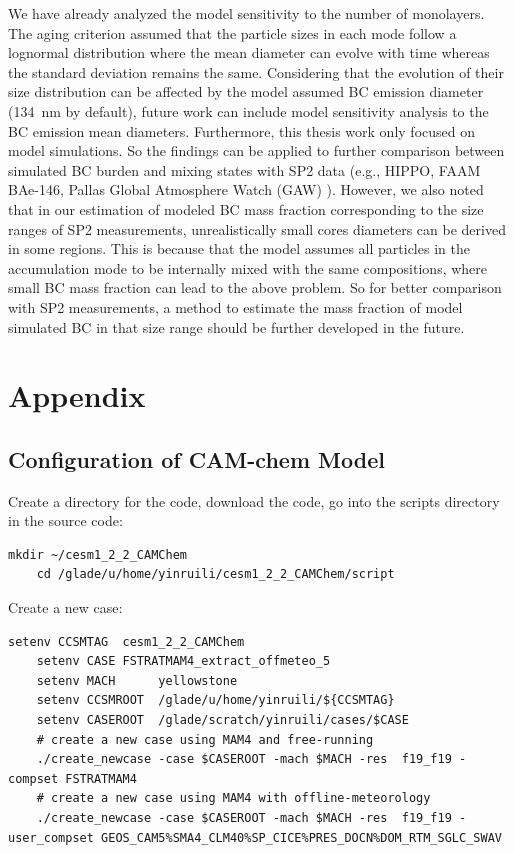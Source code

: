\documentclass[12pt, fullpage]{uiucthesis2009}
\begin{document}
		We have already analyzed the model sensitivity to the number of monolayers. The aging criterion assumed that the particle sizes in each mode follow a lognormal distribution where the mean diameter can evolve with time whereas the standard deviation remains the same. Considering that the evolution of their size distribution can be affected by the model assumed BC emission diameter (134~nm by default), future work can include model sensitivity analysis to the BC emission mean diameters. Furthermore, this thesis work only focused on model simulations. So the findings can be applied to further comparison between simulated BC burden and mixing states with SP2 data (e.g., HIPPO, FAAM BAe-146, Pallas Global Atmosphere Watch (GAW) ). However, we also noted that in our estimation of modeled BC mass fraction corresponding to the size ranges of SP2 measurements, unrealistically small cores diameters can be derived in some regions. This is because that the model assumes all particles in the accumulation mode to be internally mixed with the same compositions, where small BC mass fraction can lead to the above problem. So for better comparison with SP2 measurements, a method to estimate the mass fraction of model simulated BC in that size range should be further developed in the future.
		
		 
		


	
	
	\chapter{Appendix}
	
	\section{Configuration of CAM-chem Model}
	Create a directory for the code, download the code, go into the scripts directory in the source code:
	\begin{lstlisting}[xleftmargin=0.01\textwidth, xrightmargin=0.01\textwidth]
	mkdir ~/cesm1_2_2_CAMChem
	cd /glade/u/home/yinruili/cesm1_2_2_CAMChem/script
	\end{lstlisting}
	
	Create a new case:
	\begin{lstlisting}[xleftmargin=0.01\textwidth, xrightmargin=0.01\textwidth]
	setenv CCSMTAG	cesm1_2_2_CAMChem
	setenv CASE	FSTRATMAM4_extract_offmeteo_5
	setenv MACH      yellowstone
	setenv CCSMROOT  /glade/u/home/yinruili/${CCSMTAG}
	setenv CASEROOT  /glade/scratch/yinruili/cases/$CASE
	# create a new case using MAM4 and free-running
	./create_newcase -case $CASEROOT -mach $MACH -res  f19_f19 -compset FSTRATMAM4
	# create a new case using MAM4 with offline-meteorology
	./create_newcase -case $CASEROOT -mach $MACH -res  f19_f19 -user_compset GEOS_CAM5%SMA4_CLM40%SP_CICE%PRES_DOCN%DOM_RTM_SGLC_SWAV 
	\end{lstlisting}
	
\end{document}
